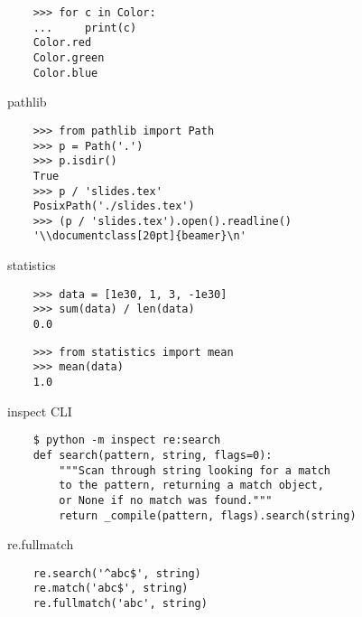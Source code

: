 \documentclass[20pt]{beamer}
\renewcommand\emph[1]{\textcolor{taskyblue}{#1}}
\begin{document}
\begin{center}
\begin{frame}[fragile]
\begin{verbatim}
    >>> for c in Color:
    ...     print(c)
    Color.red
    Color.green
    Color.blue
    \end{verbatim}
\end{frame}

\begin{frame}[fragile]
    \emph{pathlib}
    \bigskip

    \tiny
    \begin{verbatim}
    >>> from pathlib import Path
    >>> p = Path('.')
    >>> p.isdir()
    True
    >>> p / 'slides.tex'
    PosixPath('./slides.tex')
    >>> (p / 'slides.tex').open().readline()
    '\\documentclass[20pt]{beamer}\n'
    \end{verbatim}
\end{frame}

\begin{frame}[fragile]
    \emph{statistics}
    \bigskip

    \tiny
    \begin{verbatim}
    >>> data = [1e30, 1, 3, -1e30]
    >>> sum(data) / len(data)
    0.0
    \end{verbatim}

    \begin{verbatim}
    >>> from statistics import mean
    >>> mean(data)
    1.0
    \end{verbatim}
\end{frame}

\begin{frame}[fragile]
    inspect \emph{CLI}
    \bigskip

    \tiny
    \begin{verbatim}
    $ python -m inspect re:search
    def search(pattern, string, flags=0):
        """Scan through string looking for a match
        to the pattern, returning a match object,
        or None if no match was found."""
        return _compile(pattern, flags).search(string)
    \end{verbatim}
\end{frame}

\begin{frame}[fragile]
    re.\emph{fullmatch}
    \bigskip

    \tiny
    \begin{verbatim}
    re.search('^abc$', string)
    re.match('abc$', string)
    re.fullmatch('abc', string)
    \end{verbatim}
\end{frame}


\end{center}
\end{document}
